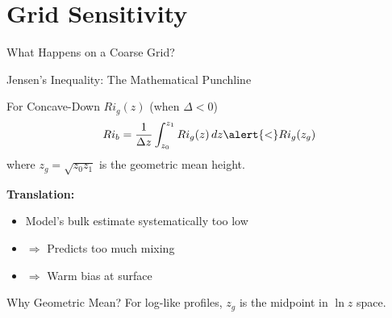 \documentclass[10pt,aspectratio=169]{beamer}
\begin{document}
\section{Grid Sensitivity}

\begin{frame}{What Happens on a Coarse Grid?}
  \begin{center}
  \end{center}
\end{frame}

\begin{frame}{Jensen's Inequality: The Mathematical Punchline}
  \begin{block}{For Concave-Down $Ri_g(z)$ (when $\Delta < 0$)}
    \[
    Ri_b = \frac{1}{\Delta z}\int_{z_0}^{z_1} Ri_g(z)\,dz \alert{<} Ri_g(z_g)
    \]
    where $z_g = \sqrt{z_0 z_1}$ is the \alert{geometric mean height}.
  \end{block}
  
  \pause
  \vspace{0.5cm}
  \textbf{Translation:}
  \begin{itemize}
    \item Model's bulk estimate systematically \alert{too low}
    \item $\Rightarrow$ Predicts \alert{too much mixing}
    \item $\Rightarrow$ \alert{Warm bias} at surface
  \end{itemize}
  
  \pause
  \vspace{0.3cm}
  \begin{exampleblock}{Why Geometric Mean?}
    For log-like profiles, $z_g$ is the midpoint in $\ln z$ space.
  \end{exampleblock}
\end{frame}
\end{document}
